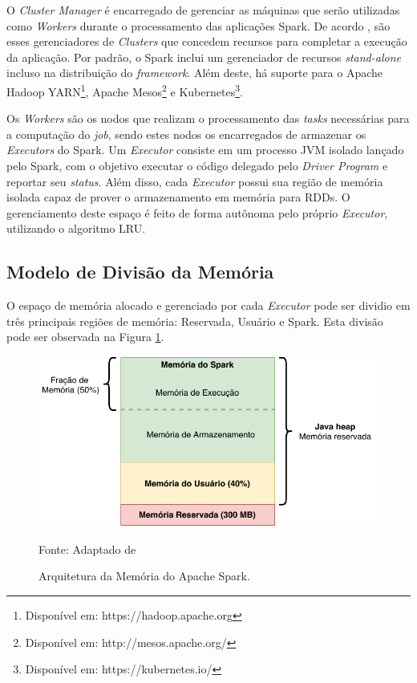 O \textit{Cluster Manager} é encarregado de gerenciar as máquinas que serão utilizadas como \textit{Workers} durante o processamento das aplicações Spark. De acordo \cite{chambers2018spark}, são esses gerenciadores de \textit{Clusters} que concedem recursos para completar a execução da aplicação. Por padrão, o Spark inclui um gerenciador de recursos \textit{stand-alone} incluso na distribuição  do \textit{framework}. Além deste, há suporte para o Apache Hadoop YARN\footnote{Disponível em: https://hadoop.apache.org}, Apache Mesos\footnote{Disponível em: http://mesos.apache.org/} e Kubernetes\footnote{Disponível em: https://kubernetes.io/}.

Os \textit{Workers} são os nodos que realizam o processamento das \textit{tasks} necessárias para a computação do \textit{job}, sendo estes nodos os encarregados de armazenar os \textit{Executors} do Spark. Um \textit{Executor} consiste em um processo JVM isolado lançado pelo Spark, com o objetivo executar o código delegado pelo \textit{Driver Program} e reportar seu \textit{status}. Além disso, cada \textit{Executor} possui sua região de memória isolada capaz de prover o armazenamento em memória para RDDs. O gerenciamento deste espaço é feito de forma autônoma pelo próprio \textit{Executor}, utilizando o algoritmo LRU.

\subsection{Modelo de Divisão da Memória}
O espaço de memória alocado e gerenciado por cada \textit{Executor} pode ser dividio em  três principais regiões de memória: Reservada, Usuário e Spark. Esta divisão pode ser observada na Figura \ref{fig:spark_memoria_arquitetura}.

\begin{figure}[!ht]
    \caption{Arquitetura da Memória do Apache Spark.}
    \begin{center}
        \includegraphics{imagens/modelo_memoria_spark_corrigido_2.pdf}
    \end{center}
    \small{Fonte: Adaptado de \cite{UnifiedMemoryManager}}
    \label{fig:spark_memoria_arquitetura}
\end{figure}

